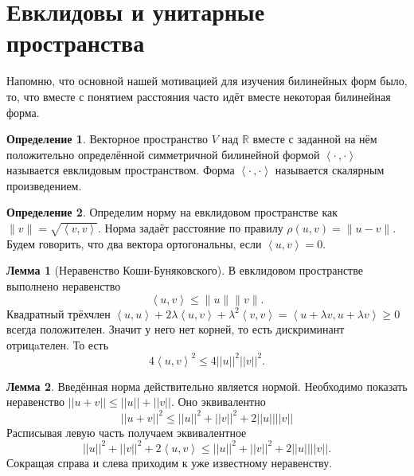 \documentclass[10pt,a4paper,oneside]{book} %
\theoremstyle{definition}
\newtheorem*{rem}{Замечание}
\newtheorem*{defn}{Определение}
\newtheorem{lem}{Лемма}
\newcommand{\mb}[1]{\mathbb{#1}}
\newcommand{\ovl}{\overline}
\def\lan{\left\langle }
\def\ran{\right\rangle}
\def\dfn{\begin{defn}}
\def\edfn{\end{defn}}
\def\lm{\begin{lem}}
\def\elm{\end{lem}}
\def\rm{\begin{rem}}
\def\erm{\end{rem}}
\begin{document}
\begin{comment}
\lm Если форма $h$ невырождена, то размерность $\dim U^{\bot}= n - \dim U
$
\elm

\dfn Полуторалинейная форма $h$ называется эрмитовой, если $h(u,v)=\ovl{h(v,u)}$ и косоэрмитовой, если $h(u,v)=-\ovl{h(v,u)}$.
\edfn

\rm Полуторалинейная форма над $\mb C$ эрмитова тогда и только тогда, когда её матрица $A$ в некотором базисе удовлетворяет соотношению $\ovl{A^{\top}}=A$. В случае тождественного автоморфизма эрмитовость эквивалентна симметричности.
\erm
\end{comment}




\section{Евклидовы и унитарные пространства}

Напомню, что основной нашей мотивацией для изучения билинейных форм было, то, что вместе с понятием расстояния часто идёт вместе некоторая билинейная форма.





\dfn Векторное пространство $V$ над $\mb R$ вместе с заданной на нём положительно определённой симметричной билинейной формой $\lan\cdot \, , \cdot \ran$ называется евклидовым пространством. Форма $\lan\cdot \, , \cdot \ran$ называется скалярным произведением. 
\edfn

\dfn Определим  норму на евклидовом пространстве как $\|v\|=\sqrt{\lan v , v\ran }$. Норма задаёт расстояние по правилу $\rho(u,v)=\|u-v\|$. Будем говорить, что два вектора ортогональны, если $\lan u,v \ran =0$.
\edfn

\lm[Неравенство Коши-Буняковского] В евклидовом пространстве выполнено неравенство
$$ \lan u,v\ran \leq \|u\|\|v\|.$$
\proof  Квадратный трёхчлен $\lan u,u\ran +2\lambda\lan u,v\ran +\lambda^2\lan v,v\ran=\lan u+\lambda v, u+\lambda v\ran \geq 0$ всегда положителен. Значит у него нет корней, то есть дискриминант отрицaтелен. То есть $$4\lan u,v\ran^2 \leq 4 ||u||^2||v||^2.$$
\endproof
\elm

\lm Введённая норма действительно является нормой.
\proof Необходимо показать неравенство $||u+v||\leq ||u||+||v||$. Оно эквивалентно $$||u+v||^2 \leq ||u||^2+||v||^2+2||u||||v||$$
Расписывая левую часть получаем эквивалентное
$$ ||u||^2+||v||^2+2\lan u,v\ran \leq ||u||^2+||v||^2+2||u||||v||.$$
Сокращая справа и слева приходим к уже известному неравенству.
\endproof
\elm
\end{document}
